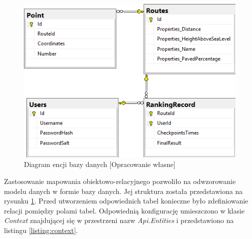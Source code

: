 \begin{figure}[h]
\begin{center}
\includegraphics{img/er-diagram.png}
\caption{Diagram encji bazy danych [Opracowanie własne]}\label{image:db-structure}
\end{center}
\end{figure}

Zastosowanie mapowania obiektowo-relacyjnego pozwoliło na odwzorowanie modelu danych w formie bazy danych. Jej struktura została przedstawiona na rysunku \ref{image:db-structure}. Przed utworzeniem odpowiednich tabel konieczne było zdefiniowanie relacji pomiędzy polami tabel. Odpowiednią konfigurację umieszczono w klasie \textit{Context} znajdującej się w przestrzeni nazw \textit {Api.Entities} i przedstawiono na listingu \ref{listing:context}.

